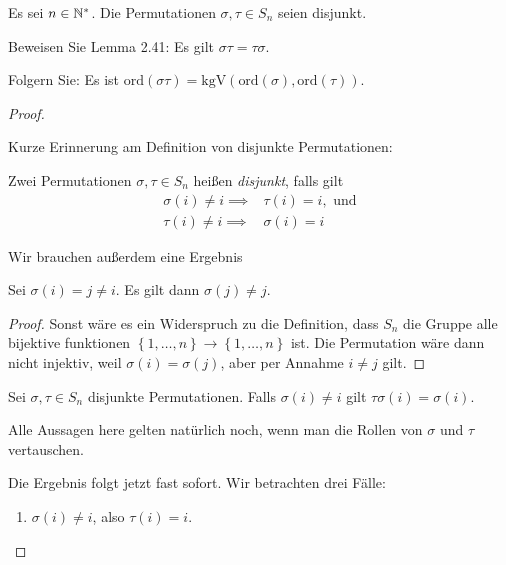 \begin{Problem}\label{pr:introalgblatt5-2}
	Es sei $n\in \mathbb{N}^*$. Die Permutationen $\sigma, \tau\in S_n$ seien disjunkt.
	\begin{parts}
	\item Beweisen Sie Lemma 2.41: Es gilt $\sigma\tau=\tau\sigma$.
	\item Folgern Sie: Es ist $\text{ord}(\sigma\tau)=\text{kgV}(\text{ord}(\sigma),\text{ord}(\tau))$.
	\end{parts}
\end{Problem}
\begin{proof}
	\begin{parts}
	\item Kurze Erinnerung am Definition von disjunkte Permutationen:
		\begin{tcolorbox}
			\begin{Definition}\label{def:introalgblatt5-1}
			Zwei Permutationen $\sigma,\tau\in S_n$ heißen \emph{disjunkt}, falls gilt
			\begin{align*}
				\sigma(i)\neq i\implies& \tau(i)=i,\text{ und}\\
				\tau(i)\neq i\implies& \sigma(i)=i
			\end{align*}
		\end{Definition}
		\end{tcolorbox}
		Wir brauchen außerdem eine Ergebnis
		\begin{tcolorbox}
			\begin{Lemma}
				Sei $\sigma(i)=j\neq i$. Es gilt dann $\sigma(j)\neq j$.
			\end{Lemma}
			\begin{proof}
				Sonst wäre es ein Widerspruch zu die Definition, dass $S_n$ die Gruppe alle bijektive funktionen $\left\{ 1,\dots, n \right\} \to \left\{ 1, \dots, n \right\} $ ist. Die Permutation wäre dann nicht injektiv, weil $\sigma(i)=\sigma(j)$, aber per Annahme $i\neq j$ gilt.
			\end{proof}
			\begin{Corollary}\label{corollary:introalgblatt5-1}
			Sei $\sigma,\tau\in S_n$ disjunkte Permutationen. Falls $\sigma(i)\neq i$ gilt $\tau\sigma\left( i \right) =\sigma(i)$.
			\end{Corollary}
			\begin{Remark}
				Alle Aussagen here gelten natürlich noch, wenn man die Rollen von $\sigma$ und $\tau$ vertauschen.
			\end{Remark}
		\end{tcolorbox}Die Ergebnis folgt jetzt fast sofort. Wir betrachten drei F\"{a}lle:
		\begin{enumerate}[label=(\roman*)]
			\item $\sigma(i)\neq i$, also $\tau(i)=i$.


\end{enumerate}
\end{parts}
\end{proof}

